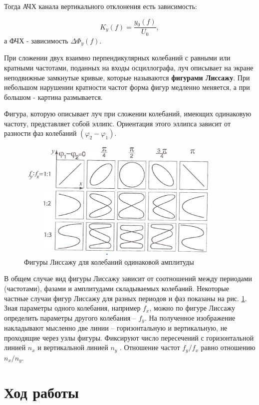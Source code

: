 \documentclass[a4paper,12pt]{article} %
\begin{document}
Тогда АЧХ канала вертикального отклонения есть зависимость:

\begin{equation}
K_y\left(f\right) = \frac{y_0\left(f\right)}{U_0}, \label{ahch}
\end{equation}
а ФЧХ - зависимость $ \Delta\Phi_y\left(f\right) $.

При сложении двух взаимно перпендикулярных колебаний с равными или кратными частотами, поданных на входы осциллографа, луч описывает на экране неподвижные замкнутые кривые, которые называются \textbf{фигурами Лиссажу}. При небольшом нарушении кратности частот форма фигур медленно меняется, а при большом - картина размывается.

Фигура, которую описывает луч при сложении колебаний, имеющих одинаковую частоту, представляет собой эллипс. Ориентация этого эллипса зависит от разности фаз колебаний $ \left(\varphi_2-\varphi_1\right) $.

\begin{figure}
	\includegraphics[width=10cm]{l_prim.png}
	\caption{Фигуры Лиссажу для колебаний одинаковой амплитуды}
	\label{l_prim}
\end{figure}

В общем случае вид фигуры Лиссажу зависит от соотношений между периодами (частотами), фазами и амплитудами складываемых колебаний. Некоторые частные случаи фигур Лиссажу для разных периодов и фаз показаны на рис. \ref{l_prim}. Зная параметры одного колебания, 
например $ f_x $, можно по фигуре Лиссажу определить параметры другого колебания -- $ f_y $. На полученное изображение накладывают мысленно две линии -- горизонтальную и вертикальную, не проходящие через узлы фигуры. Фиксируют число пересечений с горизонтальной линией $ n_x $ и вертикальной линией $ n_y $ . Отношение частот $ f_y/f_x $ равно отношению $ n_x/n_y $. 

\section{Ход работы}
\end{document}
